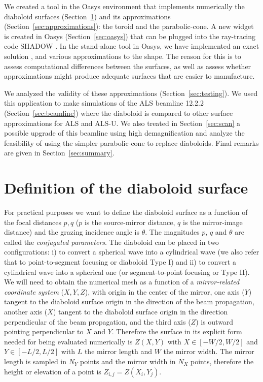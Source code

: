 \documentclass{iucr}              %
\newcommand{\inblue}[1]{{\color{blue}#1}}
\newcommand{\inred}[1]{{\color{red}#1}}
\begin{document}
We created a tool in the Oasys environment \cite{codeOASYS} that implements numerically the diaboloid surfaces (Section~\ref{sec:DiaboloidEqs}) and its approximations (Section~\ref{sec:approximations}): the toroid and the parabolic-cone. A new widget is created in Oasys (Section~\ref{sec:oasys}) that can be plugged into the ray-tracing code SHADOW \cite{codeSHADOW}. 
In the stand-alone tool in Oasys, \inblue{we have implemented an exact solution \cite{part2}, and various approximations to the shape.  The reason for this is to assess computational differences between the surfaces, as well as assess whether approximations might produce adequate surfaces that are easier to manufacture.}

We analyzed the validity of \inred{these approximations} (Section~\ref{sec:testing}).
We used this application to make simulations of the ALS beamline 12.2.2 (Section~\ref{sec:beamline}) where the diaboloid is compared to other surface approximations for ALS and ALS-U. We also treated in Section~\ref{sec:scan} a possible upgrade of this beamline using high demagnification and analyze the feasibility of using the simpler parabolic-cone to replace diaboloids. Final remarks are given in Section~\ref{sec:summary}.

\inblue{
\section{Definition of the diaboloid surface}
\label{sec:DiaboloidEqs}
}

For practical purposes  \inblue{we} want to define the diaboloid surface as a function of the focal distances $p,q$ ($p$ is the source-mirror distance, $q$ is the mirror-image distance) and the grazing incidence angle \inblue{is} $\theta$. \inred{The magnitudes $p$, $q$ and $\theta$ are called the {\it conjugated parameters}.} The diaboloid can be placed in two configurations: i) to convert a spherical wave into a cylindrical wave (we also refer that to point-to-segment focusing or diaboloid Type I) and ii) to convert a cylindrical wave into a spherical one (or segment-to-point focusing or Type II). We will need to obtain the numerical mesh as a function of a {\it mirror-related coordinate system} ($X,Y,Z$), with origin in the center of the mirror, one axis ($Y$) tangent to the diaboloid surface origin in the direction of the beam propagation, another axis ($X$) tangent to the diaboloid surface origin in the direction perpendicular of the beam propagation, and the third axis ($Z$) is outward pointing perpendicular to $X$ and $Y$. Therefore the surface in its explicit form needed for being evaluated numerically is $Z(X,Y)$ with $X \in [-W/2, W/2]$ and $Y \in [-L/2, L/2]$ with $L$ the mirror length and $W$ the mirror width. The mirror length is sampled in $N_Y$ points and the mirror width in $N_X$ points, therefore the height or elevation of a point is $Z_{i,j}=Z(X_i,Y_j)$.
\end{document}

